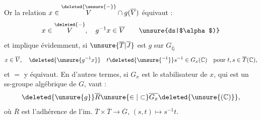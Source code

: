 Or la relation $x\in\overset{\deleted{\unsure{-}}}{V}\cap g(\overline V)$ équivaut :
\begingroup\makeatletter\tagsleft@true\makeatother
\[
x\in\overset{\deleted{-}}{V},\quad g^{-1}x\in\overline V \tag*{\unsure{ds|$\alpha$)}}
\]
\endgroup
et implique évidemment, si $\unsure{\overline T|\overline J}$ est    $g$ sur $G_{\overline{\mathbb Q}}$
\[
x\in\overline V,\quad\deleted{\unsure{g^{-1}x}}\quad t\deleted{\unsure{^{-1}}}s^{-1}\in G_x(\mathbb C)\quad\text{pour }t,s\in\overline T(\mathbb C),
\]
et $=$ y équivaut.
En d'autres termes, si $G_x$ est le stabilisateur de $x$, qui est un ss-groupe algébrique de $G$,  vaut :
\[
\deleted{\unsure{g}}\overline R\unsure{\in|\subset}\overline{G_x}\deleted{\unsure{(\mathbb C)}},
\]
où $\overline R$ est l'adhérence de l'im. $\overline T\times\overline T\longrightarrow\overline G$, $(s,t)\longmapsto s^{-1}t$.


